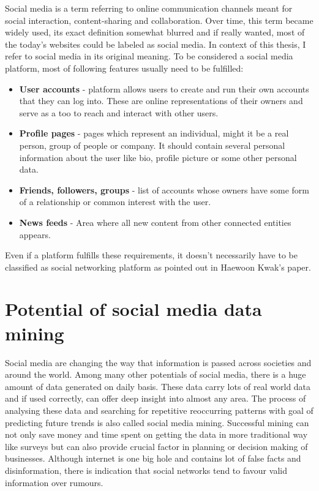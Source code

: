 Social media is a term referring to online communication channels meant for social interaction, content-sharing and collaboration. Over time, this term became widely used, its exact definition somewhat blurred and if really wanted, most of the today's websites could be labeled as social media. In context of this thesis,  I refer to social media in its original meaning. To be considered a social media platform, most of following features usually need to be fulfilled:

\begin{itemize}
  \item \textbf{User accounts} - platform allows users to create and run their own accounts that they can log into. These are online representations of their owners and serve as a too to reach and interact with other users.
  \item \textbf{Profile pages} - pages which represent an individual, might it be a real person, group of people or company. It should contain several personal information about the user like bio, profile picture or some other personal data.
  \item \textbf{Friends, followers, groups} - list of accounts whose owners have some form of a relationship  or common interest with the user.
  \item \textbf{News feeds} - Area where all new content from other connected entities appears.
\end{itemize}

Even if a platform fulfills these requirements, it doesn't necessarily have to be classified as social networking platform as pointed out in Haewoon Kwak's paper\cite{kwak2010twitter}.

\section{Potential of social media data mining}
Social media are changing the way that information is passed across societies and around the world.\cite{mayfield2008social}
Among many other potentials of social media, there is a huge amount of data generated on daily basis. These data carry lots of real world data and if used correctly, can offer deep insight into almost any area. The process of analysing these data and searching for repetitive reoccurring patterns with goal of predicting future trends is also called social media mining. Successful mining can not only save money and time spent on getting the data in more traditional way like surveys but can also provide crucial factor in planning or decision making of businesses. Although internet is one big hole and contains lot of false facts and disinformation, there is indication that social networks tend to favour
valid information over rumours.\cite{castillo2011information} 

